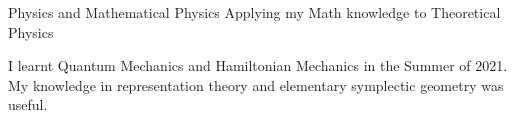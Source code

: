 \HeadingItemListStart
	\HeadingItem
		{Physics and Mathematical Physics}{}
		{Applying my Math knowledge to Theoretical Physics}{}
		\ItemListStart
			\item I learnt Quantum Mechanics and Hamiltonian Mechanics in the Summer of 2021. My knowledge in representation theory and elementary symplectic geometry was useful.
		\ItemListEnd

	
\HeadingItemListEnd

